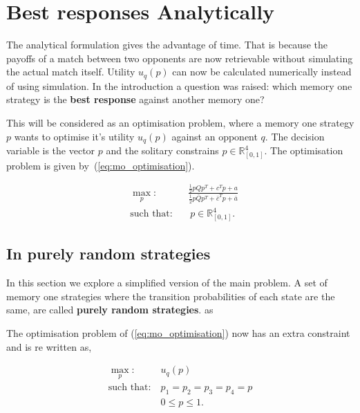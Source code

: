 \documentclass[10pt]{article}
\newcommand{\R}{\mathbb{R}}
\begin{document}
\section{Best responses Analytically}

The analytical formulation gives the advantage of time. That is because the
payoffs of a match between two opponents are now retrievable without
simulating the actual match itself. Utility \(u_q(p)\) can
now be calculated numerically instead of using simulation. In the introduction
a question was raised: which memory one strategy is the \textbf{best response}
against another memory one?

This will be considered as an optimisation problem, where a memory one strategy
\(p\) wants to optimise it's utility \(u_q(p)\) against an opponent \(q\).
The decision variable is the vector \(p\) and the solitary constrains
\(p \in \R^4_{[0, 1]} \). The optimisation problem is given by~(\ref{eq:mo_optimisation}).

\begin{equation}\label{eq:mo_optimisation}
\begin{aligned}
& \max_p: && \frac{\frac{1}{2}  p  Q  p^T + c^T p + a} 
                  {\frac{1}{2}  p  \bar{Q}  p^T + \bar{c}^T  p + \bar{a}}
\\
& \text{such that}: && \ p \in \R^4_{[0, 1]}.
\end{aligned}
\end{equation}

\subsection{In purely random strategies}

In this section we explore a simplified version of the main problem. A set of
memory one strategies where the transition probabilities of each state are the
same, are called \textbf{purely random strategies}.
as

The optimisation problem of (\ref{eq:mo_optimisation}) now has an extra constraint
and is re written as,

\begin{equation}\label{eq:random_optimisation}
    \begin{aligned}
    \max_p: & \ u_q(p)
    \\
    \text{such that}: & \ p_1 = p_2 = p_3 = p_4 = p \\
        & \ 0 \leq p \leq 1. 
    \end{aligned}
\end{equation}
\end{document}
